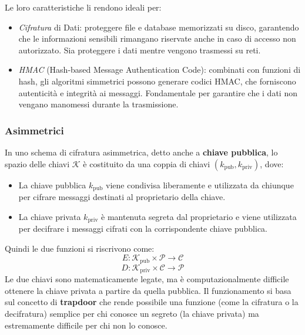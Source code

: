 \newpage

\noindent
Le loro caratteristiche li rendono ideali per:

\begin{itemize}
    \item \textit{Cifratura} di Dati: proteggere file e database memorizzati
    su disco, garantendo che le informazioni sensibili rimangano riservate anche
    in caso di accesso non autorizzato. Sia proteggere i dati mentre vengono trasmessi su reti.
    \item \textit{HMAC} (Hash-based Message Authentication Code): combinati
    con funzioni di hash, gli algoritmi simmetrici possono generare codici HMAC,
    che forniscono autenticità e integrità ai messaggi. Fondamentale per
    garantire che i dati non vengano manomessi durante la trasmissione.
\end{itemize}




\subsubsection{Asimmetrici}

In uno schema di cifratura asimmetrica, detto anche a \textbf{chiave pubblica}, lo spazio delle chiavi \(\mathcal{K}\) è costituito da una coppia di chiavi \((k_{\text{pub}}, k_{\text{priv}})\), dove:

\begin{itemize}
    \item La chiave pubblica \(k_{\text{pub}}\) viene condivisa liberamente e utilizzata da chiunque per cifrare
    messaggi destinati al proprietario della chiave.
    \item La chiave privata \(k_{\text{priv}}\) è mantenuta segreta dal
    proprietario e viene utilizzata per decifrare i messaggi cifrati con la
    corrispondente chiave pubblica.
\end{itemize}

\noindent
Quindi le due funzioni si riscrivono come:
\begin{equation}
    E: \mathcal{K}_{\text{pub}} \times \mathcal{P} \to \mathcal{C}
\end{equation}
\begin{equation}
    D: \mathcal{K}_{\text{priv}} \times \mathcal{C} \to \mathcal{P}
\end{equation}
\noindent
Le due chiavi sono matematicamente legate, ma è computazionalmente difficile \\ ottenere la chiave privata a partire da quella pubblica. Il funzionamento 
si basa sul concetto di \textbf{trapdoor} che rende possibile una funzione (come la cifratura o la decifratura) semplice per chi conosce un segreto (la chiave privata) ma estremamente difficile per chi non lo conosce.
\\

